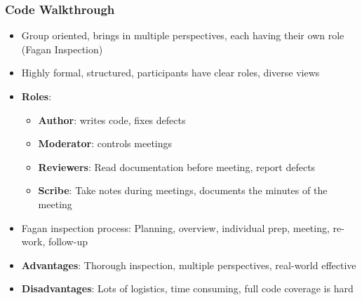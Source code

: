 \documentclass{article}
\begin{document}
\subsubsection{Code Walkthrough}
\begin{itemize}
    \item Group oriented, brings in multiple perspectives, each having their own role (Fagan Inspection)
    
    \item Highly formal, structured, participants have clear roles, diverse views
    
    \item \textbf{Roles}:
    \begin{itemize}
        \item \textbf{Author}: writes code, fixes defects
        
        \item \textbf{Moderator}: controls meetings
        
        \item \textbf{Reviewers}: Read documentation before meeting, report defects
        
        \item \textbf{Scribe}: Take notes during meetings, documents the minutes of the meeting
    \end{itemize}
    
    \item Fagan inspection process: Planning, overview, individual prep, meeting, re-work, follow-up
    
    \item \textbf{Advantages}: Thorough inspection, multiple perspectives, real-world effective
    
    \item \textbf{Disadvantages}: Lots of logistics, time consuming, full code coverage is hard
\end{itemize}
\end{document}
